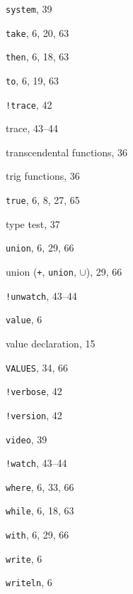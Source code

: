 \begin{theindex}
\item {{\tt system}}, 39
\indexspace
\item {{\tt take}}, 6, 20, 63
\item {{\tt then}}, 6, 18, 63
\item {{\tt to}}, 6, 19, 63
\item {{\tt !trace}}, 42
\item {trace}, 43--44
\item {transcendental functions}, 36
\item {trig functions}, 36
\item {{\tt true}}, 6, 8, 27, 65
\item {type test}, 37
\indexspace
\item {{\tt union}}, 6, 29, 66
\item {union ({\tt +}, {\tt union}, \(\cup\))}, 29, 66
\item {{\tt !unwatch}}, 43--44
\indexspace
\item {{\tt value}}, 6
\item {value declaration}, 15
\item {{\tt VALUES}}, 34, 66
\item {{\tt !verbose}}, 42
\item {{\tt !version}}, 42
\item {{\tt video}}, 39
\indexspace
\item {{\tt !watch}}, 43--44
\item {{\tt where}}, 6, 33, 66
\item {{\tt while}}, 6, 18, 63
\item {{\tt with}}, 6, 29, 66
\item {{\tt write}}, 6
\item {{\tt writeln}}, 6
\indexspace
\indexspace
\indexspace
\indexspace
\end{theindex}
